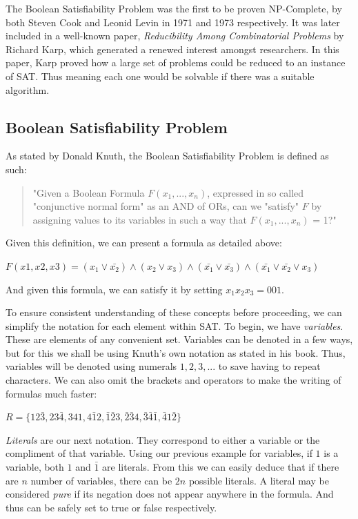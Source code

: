\documentclass{article}
\begin{document}
The Boolean Satisfiability Problem was the first to be proven NP-Complete, by both Steven Cook and
Leonid Levin in 1971 and 1973 respectively\cite{scook}\cite{levin}. It was later included in a
well-known paper, \textit{Reducibility Among Combinatorial Problems} by Richard Karp\cite{karp},
which generated a renewed interest amongst researchers. In this paper, Karp proved how a large
set of problems could be reduced to an instance of SAT. Thus meaning each one would be solvable if
there was a suitable algorithm. 

\subsection{Boolean Satisfiability Problem}
As stated by Donald Knuth\cite{donald}, the Boolean Satisfiability Problem is defined as such:

\begin{quotation}
    "Given a Boolean Formula $F(x_1,...,x_n)$, expressed in so called "conjunctive normal form" as an AND of ORs, can we "satisfy" $F$ by assigning values to its variables in such a way that $F(x_1,...,x_n)$ = 1?"
\end{quotation}

Given this definition, we can present a formula as detailed above:

\begin{center}
    $F(x1,x2,x3) = (x_1 \vee \bar{x_2}) \wedge (x_2 \vee x_3) \wedge (\bar{x_1} \vee \bar{x_3}) \wedge (\bar{x_1} \vee \bar{x_2} \vee x_3)$
\end{center}

And given this formula, we can satisfy it by setting $x_1x_2x_3 = 001$.

To ensure consistent understanding of these concepts before proceeding, we can simplify the notation
for each element within SAT. To begin, we have \textit{variables}. These are elements of any
convenient set. Variables can be denoted in a few ways, but for this we shall be using Knuth's own
notation as stated in his book. Thus, variables will be denoted using numerals $1, 2, 3, ...$ to save
having to repeat characters. We can also omit the brackets and operators to make the writing of
formulas much faster:

\begin{center}
    $R = \{12\bar{3},23\bar{4},341,4\bar{1}2,\bar{1}\bar{2}3,\bar{2}\bar{3}4,\bar{3}\bar{4}\bar{1},\bar{4}1\bar{2}\}$
\end{center}

\textit{Literals} are our next notation. They correspond to either a variable or the compliment of
that variable. Using our previous example for variables, if $1$ is a variable, both $1$ and
$\bar{1}$ are literals. From this we can easily deduce that if there are $n$ number of variables,
there can be $2n$ possible literals. A literal may be considered \textit{pure} if its negation does
not appear anywhere in the formula. And thus can be safely set to true or false respectively.
\end{document}
